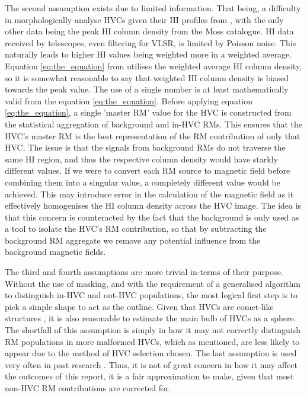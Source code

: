 The second assumption exists due to limited information. That being, a difficulty in morphologically analyse HVCs given their HI profiles from \cite{ID6}, with the only other data being the peak HI column density from the Moss catalogue. HI data received by telescopes, even filtering for VLSR, is limited by Poisson noise. This naturally leads to higher HI values being weighted more in a weighted average. Equation \ref{eq:the_equation} from \cite{ID27} utilises the weighted average HI column density, so it is somewhat reasonable to say that weighted HI column density is biased towards the peak value. The use of a single number is at least mathematically valid from the equation \ref{eq:the_equation}. Before applying equation \ref{eq:the_equation}, a single 'master RM' value for the HVC is constructed from the statistical aggregation of background and in-HVC RMs. This ensures that the HVC's master RM is the best representation of the RM contribution of only that HVC. The issue is that the signals from background RMs do not traverse the same HI region, and thus the respective column density would have starkly different values. If we were to convert each RM source to magnetic field before combining them into a singular value, a completely different value would be achieved. This may introduce error in the calculation of the magnetic field as it effectively homogenises the HI column density across the HVC image. The idea is that this concern is counteracted by the fact that the background is only used as a tool to isolate the HVC's RM contribution, so that by subtracting the background RM aggregate we remove any potential influence from the background magnetic fields. 



The third and fourth assumptions are more trivial in-terms of their purpose. Without the use of masking, and with the requirement of a generalised algorithm to distinguish in-HVC and out-HVC populations, the most logical first step is to pick a simple shape to act as the outline. Given that HVCs are comet-like structures \citep{ID13}, it is also reasonable to estimate the main bulb of HVCs as a sphere. The shortfall of this assumption is simply in how it may not correctly distinguish RM populations in more malformed HVCs, which as mentioned, are less likely to appear due to the method of HVC selection chosen. The last assumption is used very often in past research \citep{ID27,ID3, ID26, ID5}. Thus, it is not of great concern in how it may affect the outcomes of this report, it is a fair approximation to make, given that most non-HVC RM contributions are corrected for.


